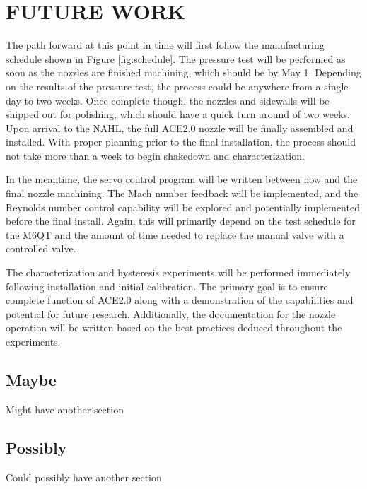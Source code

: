 %
%  
%

\chapter{FUTURE WORK}

The path forward at this point in time will first follow the manufacturing schedule shown in Figure \ref{fig:schedule}. The pressure test will be performed as soon as the nozzles are finished machining, which should be by May 1. Depending on the results of the pressure test, the process could be anywhere from a single day to two weeks. Once complete though, the nozzles and sidewalls will be shipped out for polishing, which should have a quick turn around of two weeks. Upon arrival to the NAHL, the full ACE2.0 nozzle will be finally assembled and installed. With proper planning prior to the final installation, the process should not take more than a week to begin shakedown and characterization.

In the meantime, the servo control program will be written between now and the final nozzle machining. The Mach number feedback will be implemented, and the Reynolds number control capability will be explored and potentially implemented before the final install. Again, this will primarily depend on the test schedule for the M6QT and the amount of time needed to replace the manual valve with a controlled valve. 

The characterization and hysteresis experiments will be performed immediately following installation and initial calibration. The primary goal is to ensure complete function of ACE2.0 along with a demonstration of the capabilities and potential for future research. Additionally, the documentation for the nozzle operation will be written based on the best practices deduced throughout the experiments.

\section{Maybe}

Might have another section

\section{Possibly}

Could possibly have another section


\nocite{anderson-fundamentals}
\nocite{anderson-compressible}

